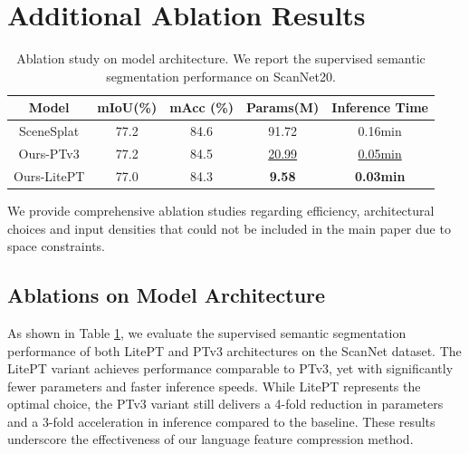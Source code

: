 \section{Additional Ablation Results}
\label{sec:ablation_details}
\label{sec:extended-ablation}
\begin{table}[tb]
  \centering
  \caption{Ablation study on model architecture. We report the supervised semantic segmentation performance on ScanNet20.}
  \label{tab:ablation-arch}
  \begin{tabular}{c|cc|cc}
    \toprule
    \textbf{Model} &  mIoU(\%) & mAcc (\%) & Params(M) & Inference Time \\
    \midrule
    SceneSplat & 77.2 & 84.6 & 91.72 & 0.16min \\
    \midrule
    Ours-PTv3 & 77.2 & 84.5 & \underline{20.99} & \underline{0.05min} \\
    Ours-LitePT & 77.0 & 84.3 & \textbf{9.58} & \textbf{0.03min} \\
    \bottomrule
  \end{tabular}
\end{table}

We provide comprehensive ablation studies regarding efficiency, architectural choices and input
densities that could not be included in the main paper due to space constraints.

\subsection{Ablations on Model Architecture}
As shown in Table \ref{tab:ablation-arch}, we evaluate the supervised semantic segmentation performance of both LitePT and PTv3 architectures on the ScanNet dataset. The LitePT variant achieves performance comparable to PTv3, yet with significantly fewer parameters and faster inference speeds. While LitePT represents the optimal choice, the PTv3 variant still delivers a 4-fold reduction in parameters and a 3-fold acceleration in inference compared to the baseline. These results underscore the effectiveness of our language feature compression method.

